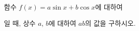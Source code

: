 함수 $f(x)=a\sin x+b\cos x$에 대하여 \par\smallskip{}\par\smallskip\noindent 일 때, 상수 $a$, $b$에 대하여 $ab$의 값을 구하시오.
